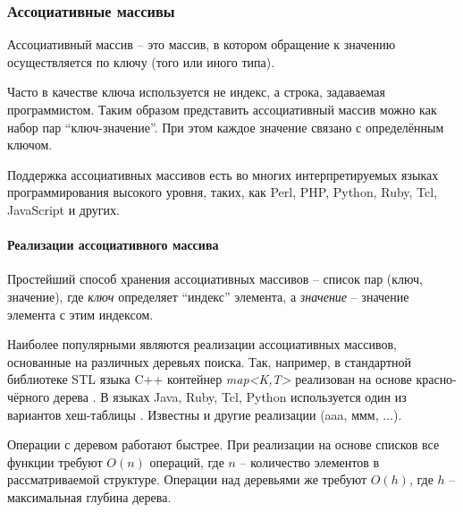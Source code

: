 \def\notedate{2021.11.22}
\def\currentauthor{Крехтунова Д.Д. (РК6-73Б)}

\subsubsection{Ассоциативные массивы}

Ассоциативный массив -- это массив, в котором обращение к значению осуществляется по ключу (того или иного типа).

Часто в качестве ключа используется не индекс, а строка, задаваемая программистом. Таким образом представить ассоциативный массив можно как набор пар ``ключ-значение''. При этом каждое значение связано с определённым ключом.

Поддержка ассоциативных массивов есть во многих интерпретируемых языках программирования высокого уровня, таких, как Perl, PHP, Python, Ruby, Tcl, JavaScript и других.

\paragraph{Реализации ассоциативного массива} Простейший способ хранения ассоциативных массивов -- список пар (ключ, значение), где \textit{ключ} определяет ``индекс'' элемента, а \textit{значение} -- значение элемента с этим индексом.

Наиболее популярными являются реализации ассоциативных массивов, основанные на различных деревьях поиска. Так, например, в стандартной библиотеке STL языка C++ контейнер \textsl{map<K,T>} реализован на основе красно-чёрного дерева \cite{XXX}. В языках Java, Ruby, Tcl, Python используется один из вариантов хеш-таблицы \cite{YYY}. Известны и другие реализации (aaa, ммм, ...).

Операции с деревом работают быстрее. При реализации на основе списков все функции требуют $O(n)$ операций, где $n$ -- количество элементов в рассматриваемой структуре. Операции над деревьями же требуют $O(h)$, где $h$ -- максимальная глубина дерева.

